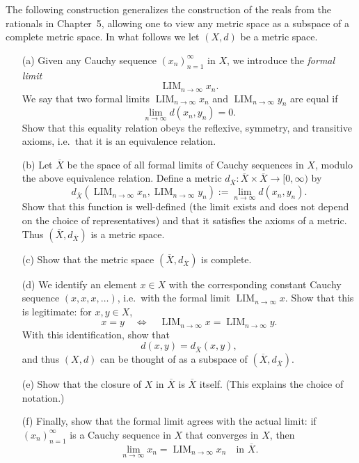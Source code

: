 \begin{problem}
    The following construction generalizes the construction of the reals from the rationals in Chapter~5, allowing one to view any metric space as a subspace of a complete metric space. In what follows we let $(X,d)$ be a metric space.
\begin{enumerate}
  \item[(a)] Given any Cauchy sequence $(x_n)_{n=1}^\infty$ in $X$, we introduce the \emph{formal limit} 
  \[
  \operatorname{LIM}_{n\to\infty} x_n.
  \]
  We say that two formal limits $\operatorname{LIM}_{n\to\infty} x_n$ and $\operatorname{LIM}_{n\to\infty} y_n$ are equal if 
  \[
  \lim_{n\to\infty} d(x_n,y_n) = 0.
  \]
  Show that this equality relation obeys the reflexive, symmetry, and transitive axioms, i.e.\ that it is an equivalence relation.

  \item[(b)] Let $\overline{X}$ be the space of all formal limits of Cauchy sequences in $X$, modulo the above equivalence relation. Define a metric $d_{\overline{X}}:\overline{X}\times\overline{X}\to [0,\infty)$ by
  \[
  d_{\overline{X}}\!\left(\operatorname{LIM}_{n\to\infty}x_n, \operatorname{LIM}_{n\to\infty} y_n\right) := \lim_{n\to\infty} d(x_n,y_n).
  \]
  Show that this function is well-defined (the limit exists and does not depend on the choice of representatives) and that it satisfies the axioms of a metric. Thus $(\overline{X},d_{\overline{X}})$ is a metric space.

  \item[(c)] Show that the metric space $(\overline{X},d_{\overline{X}})$ is complete.

  \item[(d)] We identify an element $x\in X$ with the corresponding constant Cauchy sequence $(x,x,x,\dots)$, i.e.\ with the formal limit $\operatorname{LIM}_{n\to\infty} x$. Show that this is legitimate: for $x,y\in X$, 
  \[
  x=y \quad \Longleftrightarrow \quad \operatorname{LIM}_{n\to\infty} x = \operatorname{LIM}_{n\to\infty} y.
  \]
  With this identification, show that 
  \[
  d(x,y) = d_{\overline{X}}(x,y),
  \]
  and thus $(X,d)$ can be thought of as a subspace of $(\overline{X},d_{\overline{X}})$.

  \item[(e)] Show that the closure of $X$ in $\overline{X}$ is $\overline{X}$ itself. (This explains the choice of notation.)

  \item[(f)] Finally, show that the formal limit agrees with the actual limit: if $(x_n)_{n=1}^\infty$ is a Cauchy sequence in $X$ that converges in $X$, then
  \[
  \lim_{n\to\infty} x_n = \operatorname{LIM}_{n\to\infty} x_n \quad \text{in } \overline{X}.
  \]
\end{enumerate}
\end{problem}

